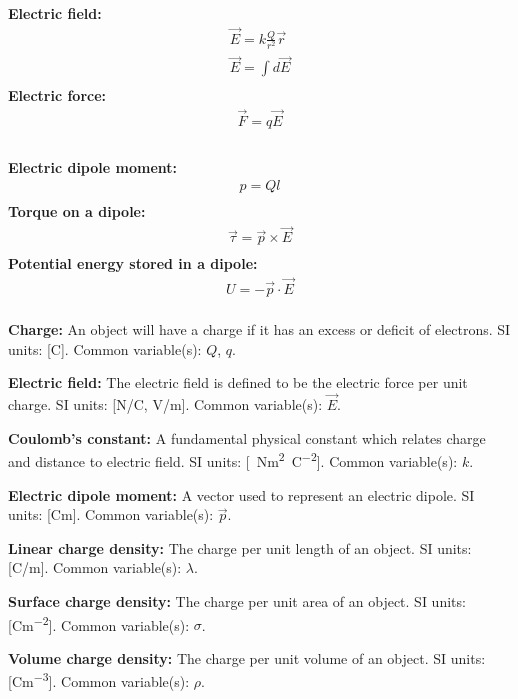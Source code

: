 \begin{importantEquations}
\medskip
\begin{multicols}{2}
\textbf{Electric field:}
\begin{align*}
\vec E = k \frac{Q}{r^2}\vec r \\
\vec E = \int d \vec E \\
\end{align*}
\textbf{Electric force:}
\begin{align*}
\vec F = q \vec E \\
\end{align*}
\columnbreak
\\
\textbf{Electric dipole moment:}
\begin{align*}
p = Ql \\
\end{align*}
\textbf{Torque on a dipole:}
\begin{align*}
\vec \tau = \vec p \times \vec E \\
\end{align*}
\textbf{Potential energy stored in a dipole:}
\begin{align*}
U = -\vec p \cdot \vec E \\
\end{align*}
\medskip
\end{multicols}
\end{importantEquations}

\begin{definitions}
	\textbf{Charge:} An object will have a charge if it has an excess or deficit of electrons. SI units: [\si{C}]. Common variable(s): $Q$, $q$.
	\item \textbf{Electric field:} The electric field is defined to be the electric force per unit charge. SI units: [\si{N/C}, \si{V/m}]. Common variable(s): $\vec E$.
	\item \textbf{Coulomb's constant:} A fundamental physical constant which relates charge and distance to electric field. SI units: [\SI{}{Nm^2C^{-2}}]. Common variable(s): $k$.
	\item \textbf{Electric dipole moment:} A vector used to represent an electric dipole. SI units: [\si{Cm}]. Common variable(s): $\vec p$.
	\item \textbf{Linear charge density:} The charge per unit length of an object. SI units: [\si{C/m}]. Common variable(s): $\lambda$.
	\item \textbf{Surface charge density:} The charge per unit area of an object. SI units: [\si{Cm^{-2}}]. Common variable(s): $\sigma$.
	\item \textbf{Volume charge density:} The charge per unit volume of an object. SI units: [\si{Cm^{-3}}]. Common variable(s): $\rho$.
\end{definitions}


